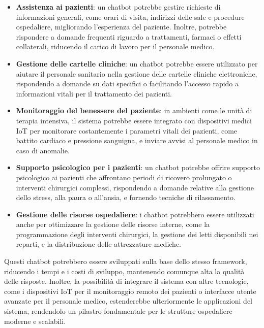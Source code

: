 \documentclass[a4paper,twoside,12pt]{toptesi}
\begin{document}
\begin{itemize}
\item \textbf{Assistenza ai pazienti}: un chatbot potrebbe gestire richieste di informazioni generali, come orari di visita, indirizzi delle sale e procedure ospedaliere, migliorando l'esperienza del paziente. Inoltre, potrebbe rispondere a domande frequenti riguardo a trattamenti, farmaci o effetti collaterali, riducendo il carico di lavoro per il personale medico.
\item \textbf{Gestione delle cartelle cliniche}: un chatbot potrebbe essere utilizzato per aiutare il personale sanitario nella gestione delle cartelle cliniche elettroniche, rispondendo a domande su dati specifici o facilitando l'accesso rapido a informazioni vitali per il trattamento dei pazienti.
\item \textbf{Monitoraggio del benessere del paziente}: in ambienti come le unità di terapia intensiva, il sistema potrebbe essere integrato con dispositivi medici IoT per monitorare costantemente i parametri vitali dei pazienti, come battito cardiaco e pressione sanguigna, e inviare avvisi al personale medico in caso di anomalie.
\item \textbf{Supporto psicologico per i pazienti}: un chatbot potrebbe offrire supporto psicologico ai pazienti che affrontano periodi di ricovero prolungato o interventi chirurgici complessi, rispondendo a domande relative alla gestione dello stress, alla paura o all'ansia, e fornendo tecniche di rilassamento.
\item \textbf{Gestione delle risorse ospedaliere}: i chatbot potrebbero essere utilizzati anche per ottimizzare la gestione delle risorse interne, come la programmazione degli interventi chirurgici, la gestione dei letti disponibili nei reparti, e la distribuzione delle attrezzature mediche.
\end{itemize}

Questi chatbot potrebbero essere sviluppati sulla base dello stesso framework, riducendo i tempi e i costi di sviluppo, mantenendo comunque alta la qualità delle risposte. Inoltre, la possibilità di integrare il sistema con altre tecnologie, come i dispositivi IoT per il monitoraggio remoto dei pazienti o interfacce utente avanzate per il personale medico, estenderebbe ulteriormente le applicazioni del sistema, rendendolo un pilastro fondamentale per le strutture ospedaliere moderne e scalabili.
 
\end{document}

